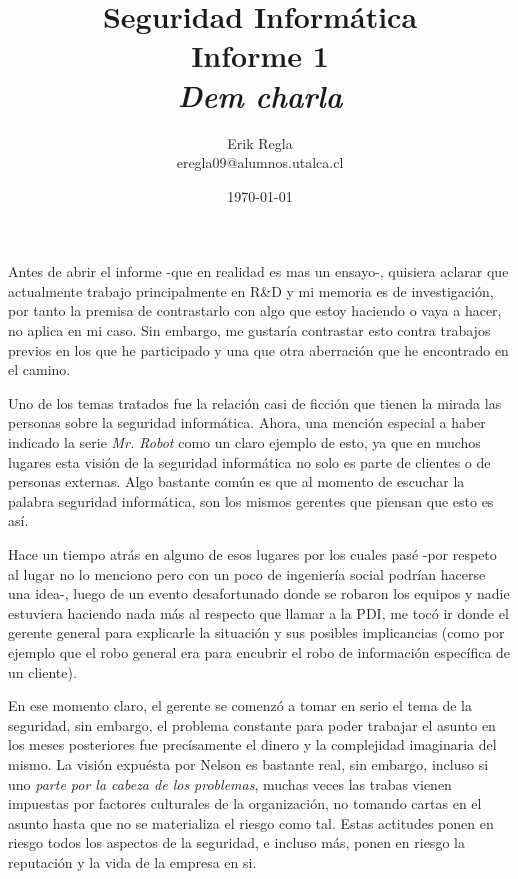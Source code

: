 \documentclass[11pt]{utalcaDoc}
\title{{\bf Seguridad Informática}\\ Informe 1 \\\textit{Dem charla}}
\author{Erik Regla\\ eregla09@alumnos.utalca.cl}
\date{\today}
\begin{document}
\maketitle

Antes de abrir el informe -que en realidad es mas un ensayo-, quisiera aclarar que actualmente trabajo principalmente en R&D y mi memoria es de investigación, por tanto la premisa de contrastarlo con algo que estoy haciendo o vaya a hacer, no aplica en mi caso. Sin embargo, me gustaría contrastar esto contra trabajos previos en los que he participado y una que otra aberración que he encontrado en el camino.

Uno de los temas tratados fue la relación casi de ficción que tienen la mirada las personas sobre la seguridad informática. Ahora, una mención especial a haber indicado la serie \textit{Mr. Robot} como un claro ejemplo de esto, ya que en muchos lugares esta visión de la seguridad informática no solo es parte de clientes o de personas externas. Algo bastante común es que al momento de escuchar la palabra seguridad informática, son los mismos gerentes que piensan que esto es así.

Hace un tiempo atrás en alguno de esos lugares por los cuales pasé -por respeto al lugar no lo menciono pero con un poco de ingeniería social podrían hacerse una idea-, luego de un evento desafortunado donde se robaron los equipos y nadie estuviera haciendo nada más al respecto que llamar a la PDI, me tocó ir donde el gerente general para explicarle la situación y sus posibles implicancias (como por ejemplo que el robo general era para encubrir el robo de información específica de un cliente).

En ese momento claro, el gerente se comenzó a tomar en serio el tema de la seguridad, sin embargo, el problema constante para poder trabajar el asunto en los meses posteriores fue precísamente el dinero y la complejidad imaginaria del mismo. La visión expuésta por Nelson es bastante real, sin embargo, incluso si uno \textit{parte por la cabeza de los problemas}, muchas veces las trabas vienen impuestas por factores culturales de la organización, no tomando cartas en el asunto hasta que no se materializa el riesgo como tal. Estas actitudes ponen en riesgo todos los aspectos de la seguridad, e incluso más, ponen en riesgo la reputación y la vida de la empresa en si.
\end{document}
